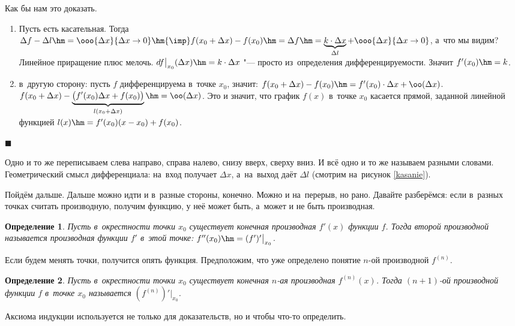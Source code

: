 \documentclass[a4paper,10pt,twoside]{article}
\newtheorem{Def}{Определение}[section]
\newenvironment{Proof}
       {\par\noindent{\textbf{Доказательство.}}}
       {\hfill$\scriptstyle\blacksquare$}
\begin{document}
\begin{Proof}
Как бы нам это доказать.

\begin{enumerate}
    \item Пусть есть касательная. Тогда $\Delta f-\Delta l\hm=\ooo{\Delta x}{\Delta x\to 0}\hm{\imp} f(x_0+\Delta x)-f(x_0)\hm=\Delta f\hm=
    \underbrace{k\cdot\Delta x}_{\Delta l}+\ooo{\Delta x}{\Delta x\to 0}$, а~что мы видим? Линейное приращение плюс мелочь. $df\big|_{x_0}(\Delta x)\hm=k\cdot \Delta x$ "--- просто из~определения дифференцируемости. Значит $f'(x_0)\hm=k$.

    \item в~другую сторону: пусть $f$ дифференцируема в~точке $x_0$, значит: $f(x_0+\Delta x)-f(x_0)\hm=f'(x_0)\cdot\Delta x+\oo(\Delta x)$.
    $f(x_0+\Delta x)-\underbrace{\big(f'(x_0)\Delta x+f(x_0)\big)}_{l(x_0+\Delta x)}\hm=\oo(\Delta x)$.
    Это и значит, что график $f(x)$ в~точке $x_0$ касается прямой, заданной линейной функцией $l(x)\hm=f'(x_0)(x-x_0)+f(x_0)$.
\end{enumerate}
\end{Proof}

Одно и то же переписываем слева направо, справа налево, снизу вверх, сверху вниз. И всё одно и то же называем разными словами.
Геометрический смысл дифференциала: на~вход получает $\Delta x$, а~на~выход даёт $\Delta l$ (смотрим на~рисунок \ref{kasanie}).

Пойдём дальше. Дальше можно идти и в~разные стороны, конечно. Можно и на~перерыв, но рано. Давайте разберёмся: если в~разных точках считать
производную, получим функцию, у неё может быть, а~может и не быть производная.

\begin{Def}
    Пусть в~окрестности точки $x_0$ существует конечная производная $f'(x)$ функции $f$. Тогда второй производной называется производная
    функции $f'$ в~этой точке: $f''(x_0)\hm=(f')'\big|_{x_0}$.
\end{Def}

Если будем менять точки, получится опять функция. Предположим, что уже определено понятие $n$-ой производной $f^{(n)}$.

\begin{Def}\label{nna}
    Пусть в~окрестности точки $x_0$ существует конечная $n$-ая производная $f^{(n)}(x)$. Тогда $(n+1)$-ой производной функции $f$ в~точке $x_0$
    называется $(f^{(n)})'\big|_{x_0}$.
\end{Def}

Аксиома индукции используется не только для доказательств, но и чтобы что-то определить.
\end{document}
